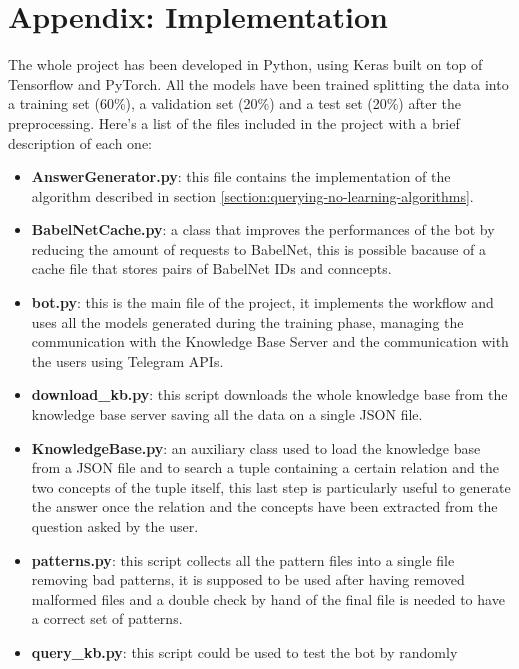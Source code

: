 \documentclass[paper=a4, fontsize=11pt]{scrartcl} %
\numberwithin{equation}{section} %
\numberwithin{figure}{section} %
\numberwithin{table}{section} %
\theoremstyle{definition}
\begin{document}

\section*{Appendix: Implementation}
\label{section:appendix}

The whole project has been developed in Python, using Keras built on top of
Tensorflow and PyTorch. All the models have been trained splitting the
data into a training set (60\%), a validation set (20\%) and a test set (20\%)
after the preprocessing. Here's a list of the files included in the project
with a brief description of each one:

\begin{itemize}
	\item \textbf{AnswerGenerator.py}: this file contains the implementation of the
		algorithm described in section \ref{section:querying-no-learning-algorithms}.
	\item \textbf{BabelNetCache.py}: a class that improves the performances of the bot
		by reducing the amount of requests to BabelNet, this is possible
		bacause of a cache file that stores pairs of BabelNet IDs and conncepts.
	\item \textbf{bot.py}: this is the main file of the project, it implements the
		workflow and uses all the models generated during the training phase,
		managing the communication with the Knowledge Base Server and
		the communication with the users using Telegram APIs.
	\item \textbf{download\_kb.py}: this script downloads the whole knowledge base
		from the knowledge base server saving all the data on a single JSON file.
	\item \textbf{KnowledgeBase.py}: an auxiliary class used to load the knowledge base
		from a JSON file and to search a tuple containing a certain relation
		and the two concepts of the tuple itself, this last step is
		particularly useful to generate the answer once the relation and the
		concepts have been extracted from the question asked by the user.
	\item \textbf{patterns.py}: this script collects all the pattern files into a single
		file removing bad patterns, it is supposed to be used after having removed
		malformed files and a double check by hand of the final file is needed
		to have a correct set of patterns.
	\item \textbf{query\_kb.py}: this script could be used to test the bot by randomly

\end{itemize}
\end{document}

